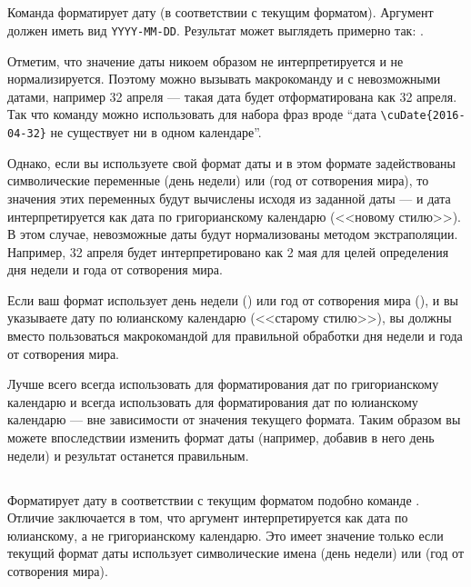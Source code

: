 \begin{RU}

\subsection{}
Команда форматирует дату (в соответствии с текущим форматом). Аргумент должен иметь вид \texttt{YYYY-MM-DD}. Результат
может выглядеть примерно так: .

Отметим, что значение даты никоем образом не интерпретируется и не нормализируется. Поэтому можно вызывать макрокоманду и с
невозможными датами, например 32 апреля --- такая дата будет отформатирована как 32 апреля. Так что команду  можно
использовать для набора фраз вроде ``дата \verb+\cuDate{2016-04-32}+ не существует ни в одном календаре''.

Однако, если вы используете свой формат даты и в этом формате задействованы символические переменные  (день недели) 
или  (год от сотворения мира), то значения этих переменных будут вычислены исходя из заданной даты --- и дата интерпретируется
как дата по григорианскому календарю (<<новому стилю>>). В этом случае, невозможные даты будут нормализованы методом экстраполяции. Например, 32 апреля
будет интерпретировано как 2 мая для целей определения дня недели и года от сотворения мира.

Если ваш формат использует день недели () или год от сотворения мира (), и вы указываете дату по юлианскому календарю (<<старому стилю>>),
вы должны вместо  пользоваться макрокомандой  для правильной обработки дня недели и года от сотворения мира.

Лучше всего всегда использовать  для форматирования дат по григорианскому календарю и всегда использовать  для
форматирования дат по юлианскому календарю --- вне зависимости от значения текущего формата. Таким образом вы можете впоследствии изменить
формат даты (например, добавив в него день недели) и результат останется правильным.

\subsection{}
Форматирует дату в соответствии с текущим форматом подобно команде . Отличие заключается в том, что аргумент
интерпретируется как дата по юлианскому, а не григорианскому календарю. Это имеет значение только если текущий формат даты
использует символические имена  (день недели) или  (год от сотворения мира).
\end{RU}

